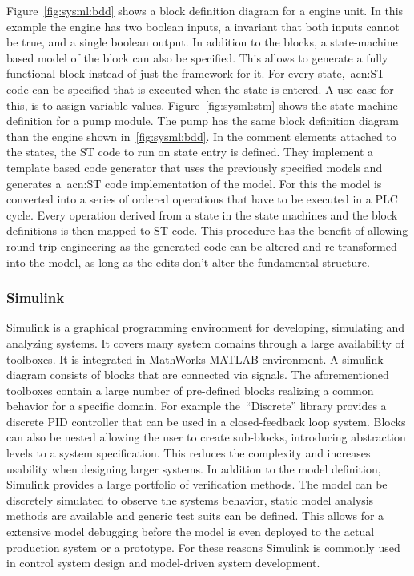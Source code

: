 Figure~\ref{fig:sysml:bdd} shows a block definition diagram for a engine unit.
In this example the engine has two boolean inputs, a invariant that both inputs cannot be true, and a single boolean output.
In addition to the blocks, a state-machine based model of the block can also be specified.
This allows to generate a fully functional block instead of just the framework for it.
For every state,~\acrshort{acn:ST} code can be specified that is executed when the state is entered.
A use case for this, is to assign variable values.
Figure~\ref{fig:sysml:stm} shows the state machine definition for a pump module.
The pump has the same block definition diagram than the engine shown in~\ref{fig:sysml:bdd}.
In the comment elements attached to the states, the ST code to run on state entry is defined.
They implement a template based code generator that uses the previously specified models and generates a~\acrshort{acn:ST} code implementation of the model.
For this the model is converted into a series of ordered operations that have to be executed in a PLC cycle.
Every operation derived from a state in the state machines and the block definitions is then mapped to ST code.
This procedure has the benefit of allowing round trip engineering as the generated code can be altered and re-transformed into the model, as long as the edits don't alter the fundamental structure.

\subsubsection{Simulink}

Simulink is a graphical programming environment for developing, simulating and analyzing systems.
It covers many system domains through a large availability of toolboxes.
It is integrated in MathWorks MATLAB environment.
A simulink diagram consists of blocks that are connected via signals.
The aforementioned toolboxes contain a large number of pre-defined blocks realizing a common behavior for a specific domain.
For example the~\enquote{Discrete} library provides a discrete PID controller that can be used in a closed-feedback loop system.
Blocks can also be nested allowing the user to create sub-blocks, introducing abstraction levels to a system specification.
This reduces the complexity and increases usability when designing larger systems.
In addition to the model definition, Simulink provides a large portfolio of verification methods.
The model can be discretely simulated to observe the systems behavior, static model analysis methods are available and generic test suits can be defined.
This allows for a extensive model debugging before the model is even deployed to the actual production system or a prototype.
For these reasons Simulink is commonly used in control system design and model-driven system development.

